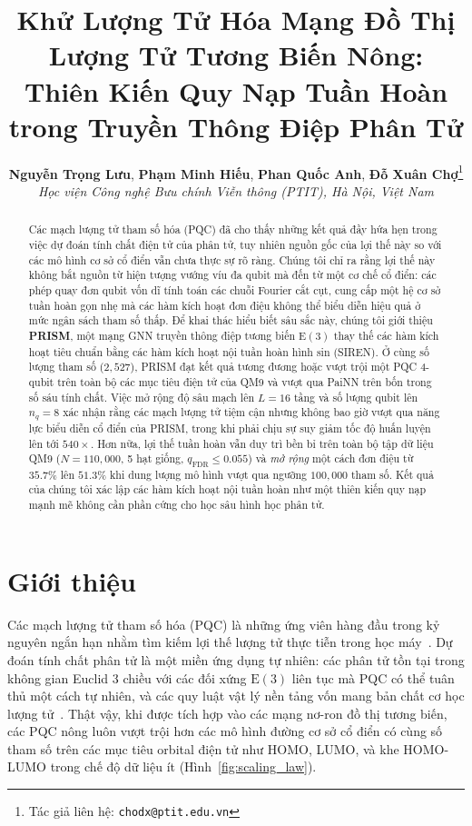 \documentclass[10pt,twocolumn,letterpaper]{article}
\title{\textbf{Khử Lượng Tử Hóa Mạng Đồ Thị Lượng Tử Tương Biến Nông: Thiên Kiến Quy Nạp Tuần Hoàn trong Truyền Thông Điệp Phân Tử}}
\author{
    \textbf{Nguyễn Trọng Lưu}, \textbf{Phạm Minh Hiếu}, \textbf{Phan Quốc Anh}, \textbf{Đỗ Xuân Chợ}\thanks{Tác giả liên hệ: \texttt{chodx@ptit.edu.vn}} \\
    \textit{Học viện Công nghệ Bưu chính Viễn thông (PTIT), Hà Nội, Việt Nam}
}
\date{}
\begin{document}
\maketitle

\begin{abstract}
Các mạch lượng tử tham số hóa (PQC) đã cho thấy những kết quả đầy hứa hẹn trong việc dự đoán tính chất điện tử của phân tử, tuy nhiên nguồn gốc của lợi thế này so với các mô hình cơ sở cổ điển vẫn chưa thực sự rõ ràng. Chúng tôi chỉ ra rằng lợi thế này không bắt nguồn từ hiện tượng vướng víu đa qubit mà đến từ một cơ chế cổ điển: các phép quay đơn qubit vốn dĩ tính toán các chuỗi Fourier cắt cụt, cung cấp một hệ cơ sở tuần hoàn gọn nhẹ mà các hàm kích hoạt đơn điệu không thể biểu diễn hiệu quả ở mức ngân sách tham số thấp. Để khai thác hiểu biết sâu sắc này, chúng tôi giới thiệu \textbf{PRISM}, một mạng GNN truyền thông điệp tương biến $\mathrm{E}(3)$ thay thế các hàm kích hoạt tiêu chuẩn bằng các hàm kích hoạt nội tuần hoàn hình sin (SIREN). Ở cùng số lượng tham số ($2{,}527$), PRISM đạt kết quả tương đương hoặc vượt trội một PQC 4-qubit trên toàn bộ các mục tiêu điện tử của QM9 và vượt qua PaiNN trên bốn trong số sáu tính chất. Việc mở rộng độ sâu mạch lên $L = 16$ tầng và số lượng qubit lên $n_q = 8$ xác nhận rằng các mạch lượng tử tiệm cận nhưng không bao giờ vượt qua năng lực biểu diễn cổ điển của PRISM, trong khi phải chịu sự suy giảm tốc độ huấn luyện lên tới $540\times$. Hơn nữa, lợi thế tuần hoàn vẫn duy trì bền bỉ trên toàn bộ tập dữ liệu QM9 ($N = 110{,}000$, 5 hạt giống, $q_{\mathrm{FDR}} \le 0.055$) và \textit{mở rộng} một cách đơn điệu từ $35.7\%$ lên $51.3\%$ khi dung lượng mô hình vượt qua ngưỡng $100{,}000$ tham số. Kết quả của chúng tôi xác lập các hàm kích hoạt nội tuần hoàn như một thiên kiến quy nạp mạnh mẽ không cần phần cứng cho học sâu hình học phân tử.
\end{abstract}

\section{Giới thiệu}
\label{sec:intro}

Các mạch lượng tử tham số hóa (PQC) là những ứng viên hàng đầu trong kỷ nguyên ngắn hạn nhằm tìm kiếm lợi thế lượng tử thực tiễn trong học máy~\cite{Kandala:2017vok, Cerezo:2020mtn}. Dự đoán tính chất phân tử là một miền ứng dụng tự nhiên: các phân tử tồn tại trong không gian Euclid 3 chiều với các đối xứng $\mathrm{E}(3)$ liên tục mà PQC có thể tuân thủ một cách tự nhiên, và các quy luật vật lý nền tảng vốn mang bản chất cơ học lượng tử~\cite{satorras2022enequivariantgraphneural, thomasTensorFieldNetworks2018}. Thật vậy, khi được tích hợp vào các mạng nơ-ron đồ thị tương biến, các PQC nông luôn vượt trội hơn các mô hình đường cơ sở cổ điển có cùng số tham số trên các mục tiêu orbital điện tử như HOMO, LUMO, và khe HOMO-LUMO trong chế độ dữ liệu ít (Hình~\ref{fig:scaling_law}).
\end{document}
